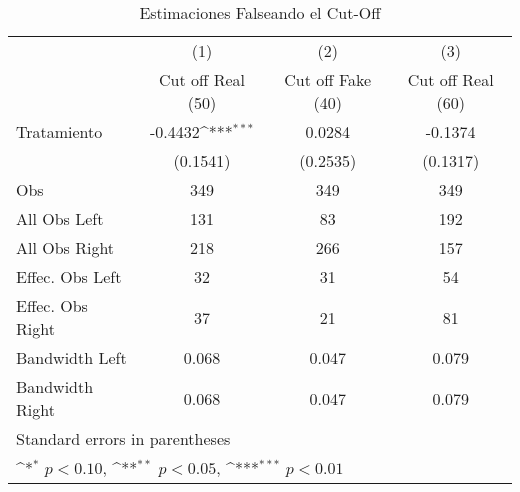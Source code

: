 \begin{table}[H]\centering            \begin{threeparttable} \def\sym#1{\ifmmode^{#1}\else\(^{#1}\)\fi}            \caption{Estimaciones Falseando el Cut-Off}
\label{comparacion cut off}
\begin{tabular}{l*{3}c}
\hline
\hline
            &\multicolumn{1}{c}{(1)}&\multicolumn{1}{c}{(2)}&\multicolumn{1}{c}{(3)}\\
            &\multicolumn{1}{c}{Cut off Real (50)}&\multicolumn{1}{c}{Cut off Fake (40)}&\multicolumn{1}{c}{Cut off Real (60)}\\
\hline
Tratamiento &     -0.4432\sym{***}&      0.0284         &     -0.1374         \\
            &    (0.1541)         &    (0.2535)         &    (0.1317)         \\
\hline
Obs         &         349         &         349         &         349         \\
All Obs Left&         131         &          83         &         192         \\
All Obs Right&         218         &         266         &         157         \\
Effec. Obs Left&          32         &          31         &          54         \\
Effec. Obs Right&          37         &          21         &          81         \\
Bandwidth Left&       0.068         &       0.047         &       0.079         \\
Bandwidth Right&       0.068         &       0.047         &       0.079         \\
\hline
\hline
\multicolumn{4}{l}{\footnotesize Standard errors in parentheses}\\
\multicolumn{5}{l}{\footnotesize \sym{*} \(p<0.10\), \sym{**} \(p<0.05\), \sym{***} \(p<0.01\)}\\
\end{tabular}
\begin{tablenotes}
\begin{footnotesize}
\end{footnotesize}
\end{tablenotes} \end{threeparttable} \end{table}
